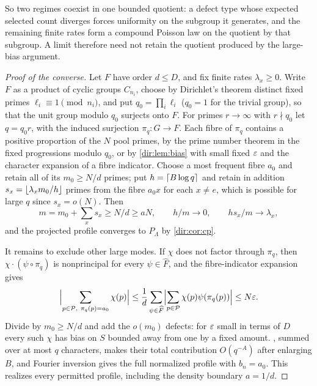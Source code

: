 So two regimes coexist in one bounded quotient: a defect type whose expected selected count diverges forces
uniformity on the subgroup it generates, and the remaining finite rates form a compound Poisson law on the
quotient by that subgroup. A limit therefore need not retain the quotient produced by the large-bias
argument.

\begin{proof}[Proof of the converse]
Let $F$ have order $d\le D$, and fix finite rates $\lambda_x\ge0$. Write $F$ as a product of cyclic groups
$C_{n_i}$, choose by Dirichlet's theorem distinct fixed primes $\ell_i\equiv1\pmod{n_i}$, and put
$q_0=\prod_i\ell_i$ ($q_0=1$ for the trivial group), so that the unit group modulo $q_0$ surjects onto $F$.
For primes $r\to\infty$ with $r\nmid q_0$ let $q=q_0r$, with the induced surjection $\pi_q\colon G\to F$.
Each fibre of $\pi_q$ contains a positive proportion of the $N$ pool primes, by the prime number theorem in
the fixed progressions modulo $q_0$, or by \cref{dir:lem:bias} with small fixed $\varepsilon$ and the character
expansion of a fibre indicator. Choose a most frequent fibre $a_0$ and retain all of its $m_0\ge N/d$
primes; put $h=\lceil B\log q\rceil$ and retain in addition $s_x=\lfloor\lambda_xm_0/h\rfloor$ primes from the fibre
$a_0x$ for each $x\ne e$, which is possible for large $q$ since $s_x=o(N)$. Then
\[
 m=m_0+\sum_xs_x\ge N/d\ge aN,\qquad h/m\to0,\qquad hs_x/m\to\lambda_x,
\]
and the projected profile converges to $P_\Lambda$ by \cref{dir:cor:cp}.

It remains to exclude other large modes. If $\chi$ does not factor through $\pi_q$, then
$\chi\cdot(\psi\circ\pi_q)$ is nonprincipal for every $\psi\in\widehat F$, and the fibre-indicator expansion
gives
\[
 \Bigl|\sum_{p\in\mathcal P,\ \pi_q(p)=a_0}\chi(p)\Bigr|\le\frac1d\sum_{\psi\in\widehat F}
 \Bigl|\sum_{p\in\mathcal P}\chi(p)\psi(\pi_q(p))\Bigr|\le N\eps .
\]
Divide by $m_0\ge N/d$ and add the $o(m_0)$ defects: for $\varepsilon$ small in terms of $D$ every such $\chi$ has
bias on $S$ bounded away from one by a fixed amount. , summed over at most $q$
characters, makes their total contribution $O(q^{-A})$ after enlarging $B$, and Fourier inversion gives
the full normalized profile with $b_n=a_0$. This realizes every permitted profile, including the density
boundary $a=1/d$.
\end{proof}


